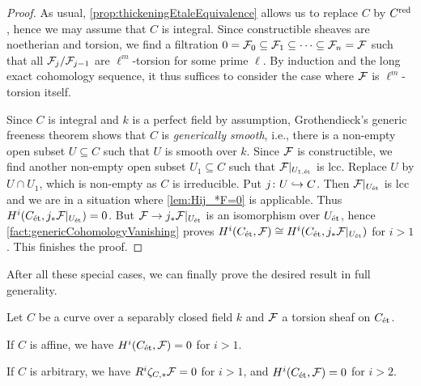 \begin{proof}
	As usual, \cref{prop:thickeningEtaleEquivalence} allows us to replace $C$ by $C^{\mathrm{red}}$, hence we may assume that $C$ is integral. Since constructible sheaves are noetherian and torsion, we find a filtration $0=\mathcal{F}_0\subseteq \mathcal{F}_1\subseteq \dotsb\subseteq \mathcal{F}_n=\mathcal{F}$ such that all $\mathcal{F}_j/\mathcal{F}_{j-1}$ are $\ell^m$-torsion for some prime $\ell$. By induction and the long exact cohomology sequence, it thus suffices to consider the case where $\mathcal{F}$ is $\ell^m$-torsion itself.
	
	Since $C$ is integral and $k$ is a perfect field by assumption, Grothendieck's generic freeness theorem shows that $C$ is \emph{generically smooth}, i.e., there is a non-empty open subset $U\subseteq C$ such that $U$ is smooth over $k$. Since $\mathcal{F}$ is constructible, we find another non-empty open subset $U_1\subseteq C$ such that $\mathcal{F}|_{U_{1,\mathrm{\acute{e}t}}}$ is lcc. Replace $U$ by $U\cap U_1$, which is non-empty as $C$ is irreducible. Put $j\colon U\monomorphism C$. Then $\mathcal{F}|_{U_{\mathrm{\acute{e}t}}}$ is lcc and we are in a situation where \cref{lem:Hij_*F=0} is applicable. Thus $H^i(C_{\mathrm{\acute{e}t}},j_*\mathcal{F}|_{U_{\mathrm{\acute{e}t}}})=0$. But $\Ff\morphism j_*\Ff|_{U_\et}$ is an isomorphism over $U_{\mathrm{\acute{e}t}}$, hence \cref{fact:genericCohomologyVanishing} proves $H^i(C_{\mathrm{\acute{e}t}},\mathcal{F})\cong H^i(C_{\mathrm{\acute{e}t}},j_*\mathcal{F}|_{U_{\mathrm{\acute{e}t}}})$ for $i>1$. This finishes the proof.
\end{proof}
After all these special cases, we can finally prove the desired result in full generality.
\begin{prop}
	Let $C$ be a curve over a separably closed field $k$ and $\mathcal{F}$ a torsion sheaf on $C_{\mathrm{\acute{e}t}}$.
	\begin{alphanumerate}
		\item If $C$ is affine, we have $H^i(C_{\mathrm{\acute{e}t}},\mathcal{F})=0$ for $i>1$.
		\item If $C$ is arbitrary, we have $R^i\zeta_{C,*}\mathcal{F}=0$ for $i>1$, and $H^i(C_{\mathrm{\acute{e}t}},\mathcal{F})=0$ for $i>2$.
	\end{alphanumerate}
\end{prop}
